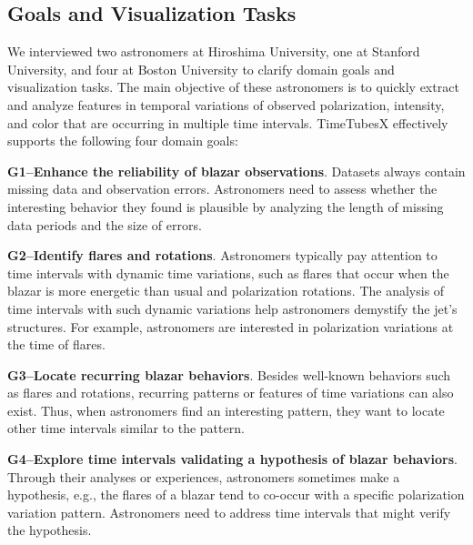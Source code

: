 \subsection{Goals and Visualization Tasks}\label{sec:domainGoalsandTasks}
We interviewed two astronomers at Hiroshima University, one at Stanford University, and four at Boston University to clarify domain goals and visualization tasks.
The main objective of these astronomers is 
to quickly extract and analyze features in temporal variations of observed polarization, intensity, and color that are occurring in multiple time intervals. 
TimeTubesX effectively supports the following four domain goals:

\noindent\textbf{G1--Enhance the reliability of blazar observations}. 
Datasets always contain missing data and observation errors. 
Astronomers need to assess whether the interesting behavior they found is plausible by analyzing the length of missing data periods and the size of errors.

\noindent\textbf{G2--Identify flares and rotations}. 
Astronomers typically pay attention to time intervals with dynamic time variations, %
such as flares that occur when the blazar is more energetic than usual and polarization rotations. %
The analysis of time intervals with such dynamic variations help astronomers demystify the jet's structures.
For example, astronomers are interested in polarization variations at the time of flares.

\noindent\textbf{G3--Locate recurring blazar behaviors}.
Besides well-known behaviors such as flares and rotations, 
recurring patterns or features of time variations can also exist.
Thus, when astronomers find an interesting pattern, 
they want to locate other time intervals similar to the pattern.

\noindent\textbf{G4--Explore time intervals validating a hypothesis of blazar behaviors}.
Through their analyses or experiences, astronomers sometimes make a hypothesis, e.g., the flares of a blazar tend to co-occur with a specific polarization variation pattern. 
Astronomers need to address time intervals that might verify the hypothesis.

